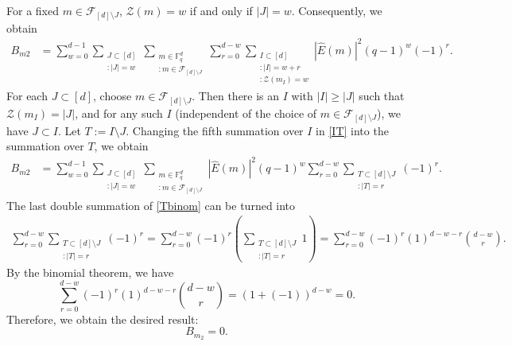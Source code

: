 \documentclass[a4paper,11pt]{amsart}
\numberwithin{equation}{section}
\begin{document}
For a fixed $m \in \mathcal{F}_{[d]\setminus J}$, $\mathcal{Z}(m) = w$ if and only if $|J| = w$. Consequently, we obtain
\begin{align}\label{IT}
    B_{m2} &=
    \sum_{w = 0}^{d-1} \sum_{\substack{{J \subset [d]}\\{:|J| = w}}}\sum_{\substack{{m \in \mathbb{F}_q^d} \\ {:m \in \mathcal{F}_{[d]\setminus J}}}}\sum_{r = 0}^{d-w}\sum_{\substack{I \subset [d]\\{:|I| = w + r} \\ {:\mathcal{Z}(m_I) = w}}}|\widehat{E}(m)|^2 (q-1)^w(-1)^{r}.
\end{align}
For each $J\subset [d]$, choose $m\in \mathcal{F}_{[d]\setminus J}$. Then there is an $I$ with
$|I|\geq |J|$ such that  $  {\mathcal{Z}(m_I) = |J|}$, and for any such $I$ (independent of the choice of $m\in \mathcal{F}_{[d]\setminus J}$), we have $J\subset I.$  Let $T:=I\setminus J.$ Changing the fifth summation over $I$ in \eqref{IT} into the summation over $T$, we obtain
\begin{equation}\label{Tbinom}
\begin{aligned}
    B_{m2} &= 
    \sum_{w = 0}^{d-1} \sum_{\substack{{J \subset [d]}\\{:|J| = w}}}\sum_{\substack{{m \in \mathbb{F}_q^d} \\ {:m \in \mathcal{F}_{[d]\setminus J}}}}|\widehat{E}(m)|^2 (q-1)^w\sum_{r = 0}^{d-w}\sum_{\substack{{T \subset [d]\setminus J}\\{:|T| = r}}}(-1)^{r}.
\end{aligned}
\end{equation}
The last double summation  of \eqref{Tbinom} can be turned into 
\begin{equation*}
\begin{aligned}
    \sum_{r = 0}^{d-w}\sum_{\substack{{T \subset [d]\setminus J}\\{:|T| = r}}}(-1)^{r}=\sum_{r = 0}^{d-w}(-1)^{r}\left( \sum_{\substack{{T \subset [d]\setminus J}\\{:|T| = r}}}1 \right)=\sum_{r = 0}^{d-w}(-1)^{r}(1)^{d-w-r}\binom{d-w}{r}.
\end{aligned}
\end{equation*}
By the binomial theorem, we have
\begin{equation*}
    \sum_{r = 0}^{d-w}(-1)^{r}(1)^{d-w-r}\binom{d-w}{r}= (1+(-1))^{d-w} =0.
\end{equation*}
Therefore, we obtain the desired result:
\begin{equation}\label{can}
B_{m_2} = 0. 
\end{equation}
\end{document}
